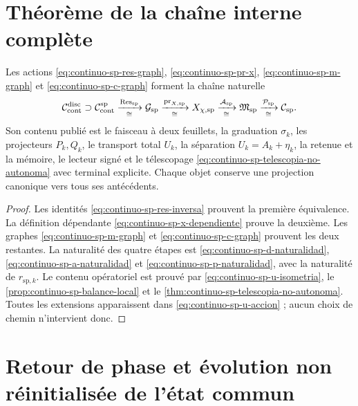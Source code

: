 \section{Théorème de la chaîne interne complète}

\begin{theorem}
\label{thm:continuo-sp-cadena-interna}
Les actions
\eqref{eq:continuo-sp-res-graph},
\eqref{eq:continuo-sp-pr-x},
\eqref{eq:continuo-sp-m-graph} et
\eqref{eq:continuo-sp-c-graph} forment la chaîne naturelle
\begin{equation}
\label{eq:continuo-sp-cadena-interna}
 \mathcal C_{\rm cont}^{\rm disc}
 \supset\mathcal C_{\rm cont}^{\mathrm{sp}}
 \xrightarrow[\cong]{\operatorname{Res}_{\mathrm{sp}}}
 \mathcal G_{\mathrm{sp}}
 \xrightarrow[\cong]{\operatorname{pr}_{X,\mathrm{sp}}}
 X_{\chi,\mathrm{sp}}
 \xrightarrow[\cong]{\mathcal A_{\mathrm{sp}}}
 \mathfrak M_{\mathrm{sp}}
 \xrightarrow[\cong]{\mathcal P_{\mathrm{sp}}}
 \mathcal C_{\mathrm{sp}}.
\end{equation}
Son contenu publié est le faisceau à deux feuillets, la graduation
\(\sigma_k\), les projecteurs \(P_k,Q_k\), le transport total \(U_k\),
la séparation \(U_k=A_k+\eta_k\), la retenue et la mémoire, le lecteur signé
et le télescopage
\eqref{eq:continuo-sp-telescopia-no-autonoma} avec terminal explicite. Chaque
objet conserve une projection canonique vers tous ses antécédents.
\end{theorem}

\begin{proof}
Les identités
\eqref{eq:continuo-sp-res-inversa} prouvent la première équivalence. La
définition dépendante \eqref{eq:continuo-sp-x-dependiente} prouve la
deuxième. Les graphes
\eqref{eq:continuo-sp-m-graph} et
\eqref{eq:continuo-sp-c-graph} prouvent les deux restantes. La naturalité des
quatre étapes est
\eqref{eq:continuo-sp-d-naturalidad},
\eqref{eq:continuo-sp-a-naturalidad} et
\eqref{eq:continuo-sp-p-naturalidad}, avec la naturalité de
\(r_{\mathrm{sp},k}\). Le contenu opératoriel est prouvé par
\eqref{eq:continuo-sp-u-isometria}, le
\cref{prop:continuo-sp-balance-local} et le
\cref{thm:continuo-sp-telescopia-no-autonoma}. Toutes les extensions apparaissent
dans \eqref{eq:continuo-sp-u-accion} ; aucun choix de
chemin n'intervient donc.
\end{proof}

\fi
\section{Retour de phase et évolution non réinitialisée de l'état commun}

